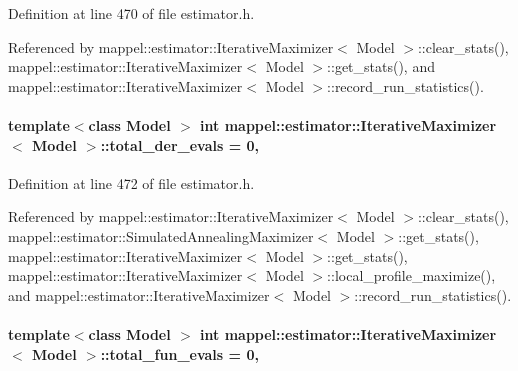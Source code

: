 Definition at line 470 of file estimator.\+h.



Referenced by mappel\+::estimator\+::\+Iterative\+Maximizer$<$ Model $>$\+::clear\+\_\+stats(), mappel\+::estimator\+::\+Iterative\+Maximizer$<$ Model $>$\+::get\+\_\+stats(), and mappel\+::estimator\+::\+Iterative\+Maximizer$<$ Model $>$\+::record\+\_\+run\+\_\+statistics().

\paragraph[{\texorpdfstring{total\+\_\+der\+\_\+evals}{total_der_evals}}]{\setlength{\rightskip}{0pt plus 5cm}template$<$class Model $>$ int {\bf mappel\+::estimator\+::\+Iterative\+Maximizer}$<$ Model $>$\+::total\+\_\+der\+\_\+evals = 0\hspace{0.3cm}{\ttfamily [protected]}, {\ttfamily [inherited]}}\hypertarget{classmappel_1_1estimator_1_1IterativeMaximizer_a79461b74a026ab06f9d1b4a9f96bdaa0}{}\label{classmappel_1_1estimator_1_1IterativeMaximizer_a79461b74a026ab06f9d1b4a9f96bdaa0}


Definition at line 472 of file estimator.\+h.



Referenced by mappel\+::estimator\+::\+Iterative\+Maximizer$<$ Model $>$\+::clear\+\_\+stats(), mappel\+::estimator\+::\+Simulated\+Annealing\+Maximizer$<$ Model $>$\+::get\+\_\+stats(), mappel\+::estimator\+::\+Iterative\+Maximizer$<$ Model $>$\+::get\+\_\+stats(), mappel\+::estimator\+::\+Iterative\+Maximizer$<$ Model $>$\+::local\+\_\+profile\+\_\+maximize(), and mappel\+::estimator\+::\+Iterative\+Maximizer$<$ Model $>$\+::record\+\_\+run\+\_\+statistics().

\paragraph[{\texorpdfstring{total\+\_\+fun\+\_\+evals}{total_fun_evals}}]{\setlength{\rightskip}{0pt plus 5cm}template$<$class Model $>$ int {\bf mappel\+::estimator\+::\+Iterative\+Maximizer}$<$ Model $>$\+::total\+\_\+fun\+\_\+evals = 0\hspace{0.3cm}{\ttfamily [protected]}, {\ttfamily [inherited]}}\hypertarget{classmappel_1_1estimator_1_1IterativeMaximizer_aa4f49112ff3b145fa1096a7ac4d48af7}{}\label{classmappel_1_1estimator_1_1IterativeMaximizer_aa4f49112ff3b145fa1096a7ac4d48af7}


